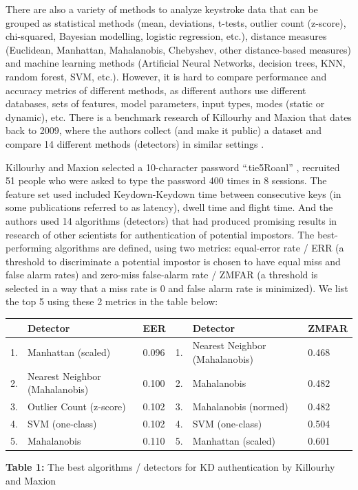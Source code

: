 \documentclass[12pt,a4]{article}
\begin{document}
There are also a variety of methods to analyze keystroke data that can be grouped as statistical methods (mean, deviations, t-tests, outlier count (z-score), chi-squared, Bayesian modelling, logistic regression, etc.), distance measures (Euclidean, Manhattan, Mahalanobis, Chebyshev, other distance-based measures) and machine learning methods (Artificial Neural Networks, decision trees, KNN, random forest, SVM, etc.). However, it is hard to compare performance and accuracy metrics of different methods, as different authors use different databases, sets of features, model parameters, input types, modes (static or dynamic), etc. There is a benchmark research of Killourhy and Maxion that dates back to 2009, where the authors collect (and make it public) a dataset and compare 14 different methods (detectors) in similar settings \cite{killourhy2009comparing}.

Killourhy and Maxion selected  a 10-character password “.tie5Roanl” , recruited 51 people who were asked to type the password 400 times in 8 sessions. The feature set used included  Keydown-Keydown time between consecutive keys (in some publications referred to as latency), dwell time and flight time. And the authors used 14 algorithms (detectors) that had produced promising results in research of other scientists for authentication of potential impostors. The best-performing algorithms are defined, using two metrics: equal-error rate / ERR (a threshold to discriminate a potential impostor is chosen to have equal miss and false alarm rates) and zero-miss false-alarm rate / ZMFAR (a threshold is selected in a way that a miss rate is 0 and false alarm rate is minimized). We list the top 5 using these 2 metrics in the table below:

\begin{center}

\begin{tabular*}{\textwidth}{l @{\extracolsep{\fill}} lllll}

\hline
 & \textbf{Detector} & \textbf{EER} & & \textbf{Detector} & \textbf{ZMFAR} \\
 \hline
1. & Manhattan (scaled) & 0.096 & 1. & Nearest Neighbor (Mahalanobis) & 0.468 \\ 
\hline
2. & Nearest Neighbor (Mahalanobis) & 0.100 & 2. & Mahalanobis & 0.482 \\ 
\hline
3. & Outlier Count (z-score) & 0.102 & 3. & Mahalanobis (normed) & 0.482 \\

\hline
4. & SVM (one-class) & 0.102 & 4. & SVM (one-class) & 0.504 \\
\hline
5. & Mahalanobis & 0.110 & 5. & Manhattan (scaled) & 0.601 \\
\hline
\end{tabular*}
\caption{\textbf{Table 1:} The best algorithms / detectors for KD authentication by Killourhy and Maxion}
\end{center}
\end{document}
